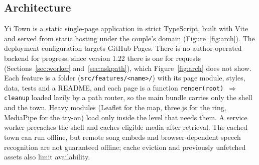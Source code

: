 \documentclass[sigconf,nonacm]{acmart}
\newcommand{\yt}{Yi Town}
\newcommand{\code}[1]{\textnormal{\texttt{\small #1}}}
\begin{document}
\subsection{Architecture}
\yt{} is a static single-page application in strict TypeScript, built with Vite and served from
static hosting under the couple's domain (Figure~\ref{fig:arch}). The deployment configuration
targets GitHub Pages. There is no author-operated backend for progress; since version 1.22 there
is one for requests (Sections~\ref{sec:worker} and~\ref{sec:askpath}), which Figure~\ref{fig:arch} does not show. Each feature
is a folder (\code{src/features/<name>/}) with its page module, styles, data, tests and a README,
and each page is a function \code{render(root) $\Rightarrow$ cleanup} loaded lazily by a path
router, so the main bundle carries only the shell and the town. Heavy modules (Leaflet for the map,
three.js for the ring, MediaPipe for the try-on) load only inside the level that needs them. A
service worker precaches the shell and caches eligible media after retrieval. The cached
town can run offline, but remote song embeds and browser-dependent speech recognition are not
guaranteed offline; cache eviction and previously unfetched assets also limit availability.
\end{document}
